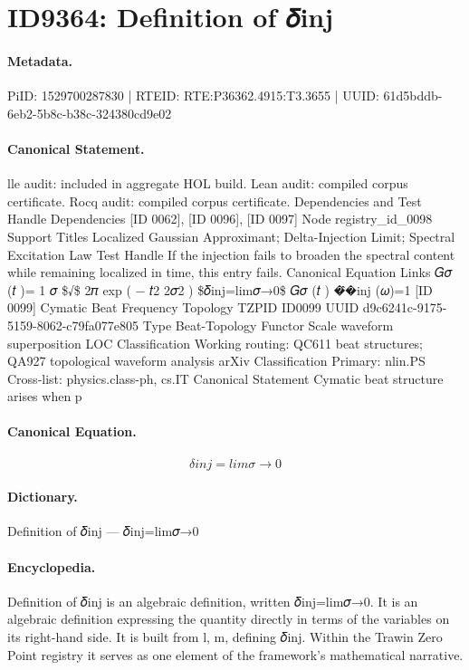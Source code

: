 \section*{ID9364: Definition of 𝛿inj}
\paragraph{Metadata.}
PiID: 1529700287830 | RTEID: RTE:P36362.4915:T3.3655 | UUID: 61d5bddb-6eb2-5b8c-b38c-324380cd9e02

\paragraph{Canonical Statement.}
lle audit: included in aggregate HOL build. Lean audit: compiled corpus certificate. Rocq audit: compiled corpus certificate. Dependencies and Test Handle Dependencies [ID 0062], [ID 0096], [ID 0097] Node registry\_id\_0098 Support Titles Localized Gaussian Approximant; Delta-Injection Limit; Spectral Excitation Law Test Handle If the injection fails to broaden the spectral content while remaining localized in time, this entry fails. Canonical Equation Links 𝐺𝜎 (𝑡 )= 1 𝜎 \$√\$ 2𝜋 exp ( − 𝑡2 2𝜎2 ) \$𝛿inj=lim𝜎→0\$ 𝐺𝜎 (𝑡 ) �̂�inj (𝜔)=1 [ID 0099] Cymatic Beat Frequency Topology TZPID ID0099 UUID d9c6241c-9175-5159-8062-c79fa077e805 Type Beat-Topology Functor Scale waveform superposition LOC Classification Working routing: QC611 beat structures; QA927 topological waveform analysis arXiv Classification Primary: nlin.PS Cross-list: physics.class-ph, cs.IT Canonical Statement Cymatic beat structure arises when p

\paragraph{Canonical Equation.}
\[
𝛿inj=lim𝜎→0
\]

\paragraph{Dictionary.}
Definition of 𝛿inj — 𝛿inj=lim𝜎→0

\paragraph{Encyclopedia.}
Definition of 𝛿inj is an algebraic definition, written 𝛿inj=lim𝜎→0. It is an algebraic definition expressing the quantity directly in terms of the variables on its right-hand side. It is built from l, m, defining 𝛿inj. Within the Trawin Zero Point registry it serves as one element of the framework's mathematical narrative.
